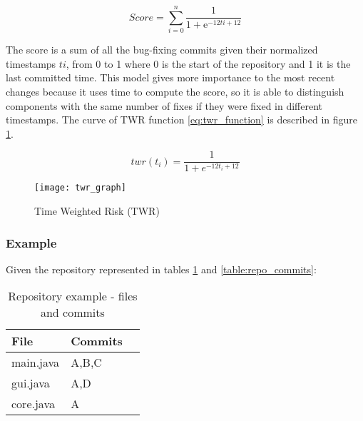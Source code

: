 \begin{equation}
 Score = \sum_{ i=0}^{n} \frac{1}{1 + \mathrm{e}^{-12ti + 12}}
\end{equation}

The score is a sum of all the bug-fixing commits given their normalized
timestamps \( ti\), from 0 to 1 where 0 is the start of the repository and 1 it
is the last committed time. This model gives more importance to the most recent
changes because it uses time to compute the score, so it is able to distinguish
components with the same number of fixes if they were fixed in different
timestamps. The curve of TWR function \ref{eq:twr_function} is described in
figure \ref{figure:twr_graph}.

\begin{equation}
\label{eq:twr_function}
twr(t_i) = \frac{1}{1 + e^{-12t_i + 12}}
\end{equation}

\begin{figure}[H]
    \begin{center}
        \texttt{[image: twr\_graph]}
        \caption{Time Weighted Risk (TWR)}
        \label{figure:twr_graph}
    \end{center}
\end{figure}

\subsubsection{Example}
Given the repository represented in tables \ref{table:repo_files_commits} and
\ref{table:repo_commits}:

\begin{table}[H]
    \caption{Repository example -  files and commits}
    \label{table:repo_files_commits}
    \begin{center}
        \begin{tabular}{ | l | l | l | }
            \hline
            File & Commits \\ \hline
            main.java & A,B,C \\ \hline
            gui.java & A,D\\ \hline
            core.java & A  \\
            \hline
        \end{tabular}
    \end{center}
\end{table}

